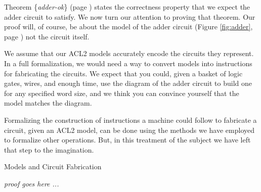 Theorem \{\emph{adder-ok}\} (page \pageref{fig:adder-schematic})
states the correctness property that
we expect the adder circuit to satisfy.
We now turn our attention to proving that theorem.
Our proof will, of course, be about the model of the adder circuit
(Figure \ref{fig:adder}, page \pageref{fig:adder})
not the circuit itself.

\begin{aside}
We assume that our ACL2 models
accurately encode the circuits they represent.
In a full formalization, we would
need a way to convert models into instructions
for fabricating the circuits.
We expect that you could, given a basket of
logic gates, wires, and enough time,
use the diagram of the adder circuit to
build one for any specified word size,
and we think you can convince yourself that the model
matches the diagram.

Formalizing the construction of instructions a machine could
follow to fabricate a circuit, given an ACL2 model,
can be done using the methods
we have employed to formalize other operations.
But, in this treatment of the subject
we have left that step to the imagination.
\caption{Models and Circuit Fabrication}
\label{circuit-vs-model}
\end{aside}

\textit{proof goes here ...}

